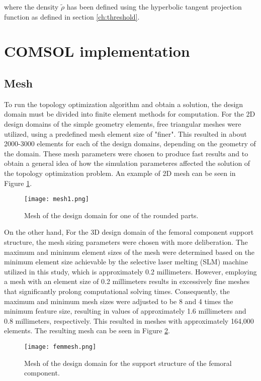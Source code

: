 \documentclass[../main.tex]{subfiles}
\begin{document}
 where the density $\tilde{\rho}$ has been defined using the hyperbolic tangent projection function as defined in section \ref{ch:threshold}.

\section{COMSOL implementation}

\subsection{Mesh}

To run the topology optimization algorithm and obtain a solution, the design domain must be divided into finite element methods for computation. For the 2D design domains of the simple geometry elements, free triangular meshes were utilized, using a predefined mesh element size of "finer". This resulted in about 2000-3000 elements for each of the design domains, depending on the geometry of the domain. These mesh parameters were chosen to produce fast results and to obtain a general idea of how the simulation parameteres affected the solution of the topology optimization problem. An example of 2D mesh can be seen in Figure \ref{fig:mesh2d}.

\begin{figure}[h!]
  \texttt{[image: mesh1.png]}
  \caption{Mesh of the design domain for one of the rounded parts.}
  \label{fig:mesh2d}
\end{figure}

On the other hand, For the 3D design domain of the femoral component support structure, the mesh sizing parameters were chosen with more deliberation. The maximum and minimum element sizes of the mesh were determined based on the minimum element size achievable by the selective laser melting (SLM) machine utilized in this study, which is approximately 0.2 millimeters. However, employing a mesh with an element size of 0.2 millimeters results in excessively fine meshes that significantly prolong computational solving times. Consequently, the maximum and minimum mesh sizes were adjusted to be 8 and 4 times the minimum feature size, resulting in values of approximately 1.6 millimeters and 0.8 millimeters, respectively. This resulted in meshes with approximately 164,000 elements. The resulting mesh can be seen in Figure \ref{fig:mesh3d}.

\begin{figure}[h!]
  \texttt{[image: femmesh.png]}
  \caption{Mesh of the design domain for the support structure of the femoral component.}
  \label{fig:mesh3d}
\end{figure}
\end{document}

